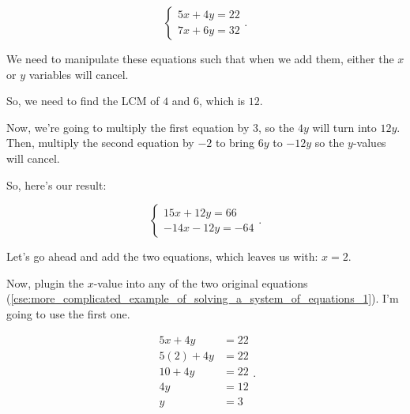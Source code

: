 \begin{example}
  \label{exm:more_complicated_example_of_solving_a_system_of_equations}

  \begin{equation}
    \label{cse:more_complicated_example_of_solving_a_system_of_equations_1}
    \begin{cases}
      5x + 4y = 22 \\
      7x + 6y = 32
    \end{cases}
  .\end{equation}

  We need to manipulate these equations such that when we add them, either the
  $x$ or $y$ variables will cancel.

  So, we need to find the LCM of $4$ and $6$, which is $12$.

  Now, we're going to multiply the first equation by $3$, so the $4y$ will turn
  into $12y$. Then, multiply the second equation by $-2$ to bring $6y$ to $-12y$ 
  so the $y$-values will cancel.

  So, here's our result:

  \begin{equation}
    \label{cse:more_complicated_example_of_solving_a_system_of_equations_2}
    \begin{cases}
      15x + 12y = 66 \\
      -14x - 12y = -64
    \end{cases}
  .\end{equation}

  Let's go ahead and add the two equations, which leaves us with: $x = 2$.
  
  Now, plugin the $x$-value into any of the two original equations
  (\ref{cse:more_complicated_example_of_solving_a_system_of_equations_1}).
  I'm going to use the first one.

  \begin{equation}
    \label{eqt:more_complicated_example_of_solving_a_system_of_equations}
    \begin{split}
      5x + 4y &= 22 \\
      5(2) + 4y &= 22 \\
      10 + 4y &= 22 \\
      4y &= 12 \\
      y &= 3 \\
    \end{split}
  .\end{equation}
\end{example}

\newpage
